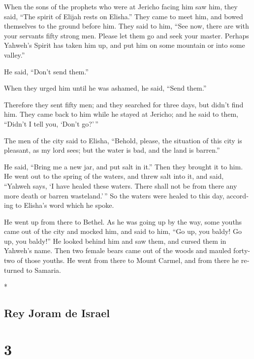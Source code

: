 \begin{paracol}{2}
\begin{otherlanguage}{english}
 When the sons of the prophets who were at Jericho facing
him saw him, they said, ``The spirit of Elijah rests on Elisha.'' They
came to meet him, and bowed themselves to the ground before him.
 They said to him, ``See now, there are with your
servants fifty strong men. Please let them go and seek your master.
Perhaps Yahweh's Spirit has taken him up, and put him on some mountain
or into some valley.''

He said, ``Don't send them.''

 When they urged him until he was ashamed, he said,
``Send them.''

Therefore they sent fifty men; and they searched for three days, but
didn't find him.  They came back to him while he stayed
at Jericho; and he said to them, ``Didn't I tell you, `Don't go?'\,''

 The men of the city said to Elisha, ``Behold, please,
the situation of this city is pleasant, as my lord sees; but the water
is bad, and the land is barren.''

 He said, ``Bring me a new jar, and put salt in it.''
Then they brought it to him.  He went out to the spring
of the waters, and threw salt into it, and said, ``Yahweh says, `I have
healed these waters. There shall not be from there any more death or
barren wasteland.'\,''  So the waters were healed to this
day, according to Elisha's word which he spoke.

 He went up from there to Bethel. As he was going up by
the way, some youths came out of the city and mocked him, and said to
him, ``Go up, you baldy! Go up, you baldy!''  He looked
behind him and saw them, and cursed them in Yahweh's name. Then two
female bears came out of the woods and mauled forty-two of those youths.
 He went from there to Mount Carmel, and from there he
returned to Samaria.

\end{otherlanguage}

\switchcolumn[0]*

\hypertarget{rey-joram-de-israel}{%
\subsection{Rey Joram de Israel}\label{rey-joram-de-israel}}

\hypertarget{section-4}{%
\section{3}\label{section-4}}


\end{paracol}
